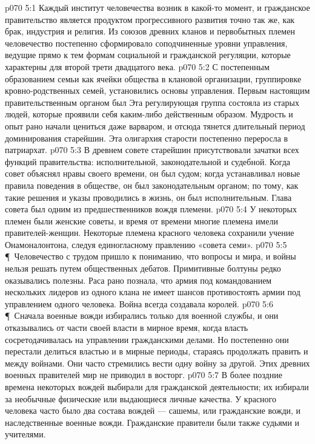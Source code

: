 \vs p070 5:1 Каждый институт человечества возник в какой\hyp{}то момент, и гражданское правительство является продуктом прогрессивного развития точно так же, как брак, индустрия и религия. Из союзов древних кланов и первобытных племен человечество постепенно сформировало соподчиненные уровни управления, ведущие прямо к тем формам социальной и гражданской регуляции, которые характерны для второй трети двадцатого века.
\vs p070 5:2 С постепенным образованием семьи как ячейки общества в клановой организации, группировке кровно\hyp{}родственных семей, установились основы управления. Первым настоящим правительственным органом был  Эта регулирующая группа состояла из старых людей, которые проявили себя каким\hyp{}либо действенным образом. Мудрость и опыт рано начали цениться даже варваром, и отсюда тянется длительный период доминирования старейшин. Эта олигархия старости постепенно переросла в патриархат.
\vs p070 5:3 В древнем совете старейшин присутствовали зачатки всех функций правительства: исполнительной, законодательной и судебной. Когда совет объяснял нравы своего времени, он был судом; когда устанавливал новые правила поведения в обществе, он был законодательным органом; по тому, как такие решения и указы проводились в жизнь, он был исполнительным. Глава совета был одним из предшественников вождя племени.
\vs p070 5:4 У некоторых племен были женские советы, и время от времени многие племена имели правителей\hyp{}женщин. Некоторые племена красного человека сохранили учение Онамоналонтона, следуя единогласному правлению «совета семи».
\vs p070 5:5 \P\ Человечество с трудом пришло к пониманию, что вопросы и мира, и войны нельзя решать путем общественных дебатов. Примитивные болтуны редко оказывались полезны. Раса рано познала, что армия под командованием нескольких лидеров из одного клана не имеет шансов противостоять армии под управлением одного человека. Война всегда создавала королей.
\vs p070 5:6 \P\ Сначала военные вожди избирались только для военной службы, и они отказывались от части своей власти в мирное время, когда власть сосретодачивалась на управлении гражданскими делами. Но постепенно они перестали делиться властью и в мирные периоды, стараясь продолжать править и между войнами. Они часто стремились вести одну войну за другой. Этих древних военных правителей мир не приводил в восторг.
\vs p070 5:7 В более поздние времена некоторых вождей выбирали для гражданской деятельности; их избирали за необычные физические или выдающиеся личные качества. У красного человека часто было два состава вождей --- сашемы, или гражданские вожди, и наследственные военные вожди. Гражданские правители были также судьями и учителями.
